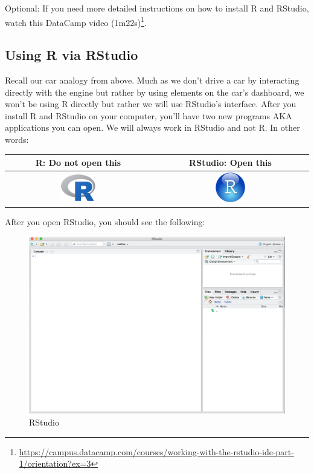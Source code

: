 \documentclass[12pt,]{krantz}
\renewcommand{\href}[2]{#2\footnote{\url{#1}}}
\begin{document}
Optional: If you need more detailed instructions on how to install R and
RStudio, watch this
\href{https://campus.datacamp.com/courses/working-with-the-rstudio-ide-part-1/orientation?ex=3}{DataCamp
video (1m22s)}.

\subsection{Using R via RStudio}\label{using-r-via-rstudio}

Recall our car analogy from above. Much as we don't drive a car by
interacting directly with the engine but rather by using elements on the
car's dashboard, we won't be using R directly but rather we will use
RStudio's interface. After you install R and RStudio on your computer,
you'll have two new programs AKA applications you can open. We will
always work in RStudio and not R. In other words:

\begin{longtable}[]{@{}cc@{}}
\toprule
R: Do not open this & RStudio: Open this\tabularnewline
\midrule
\endhead
\includegraphics[width=0.25000\textwidth]{images/Rlogo.png} &
\includegraphics[width=0.20000\textwidth]{images/RStudio-Ball.png}\tabularnewline
\bottomrule
\end{longtable}

After you open RStudio, you should see the following:

\begin{figure}
\centering
\includegraphics{images/rstudio.png}
\caption{RStudio}
\end{figure}
\end{document}

